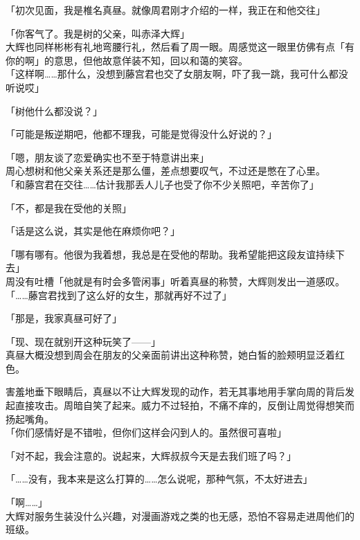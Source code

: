 「初次见面，我是椎名真昼。就像周君刚才介绍的一样，我正在和他交往」

「你客气了。我是树的父亲，叫赤泽大辉」\\

大辉也同样彬彬有礼地弯腰行礼，然后看了周一眼。周感觉这一眼里仿佛有点「有你的啊」的意思，但他故意佯装不知，回以和蔼的笑容。\\

「这样啊……那什么，没想到藤宫君也交了女朋友啊，吓了我一跳，我可什么都没听说哎」

「树他什么都没说？」

「可能是叛逆期吧，他都不理我，可能是觉得没什么好说的？」

「嗯，朋友谈了恋爱确实也不至于特意讲出来」\\

周心想树和他父亲关系还是那么僵，差点想要叹气，不过还是憋在了心里。\\

「和藤宫君在交往……估计我那丢人儿子也受了你不少关照吧，辛苦你了」

「不，都是我在受他的关照」

「话是这么说，其实是他在麻烦你吧？」

「哪有哪有。他很为我着想，我总是在受他的帮助。我希望能把这段友谊持续下去」\\

周没有吐槽「他就是有时会多管闲事」听着真昼的称赞，大辉则发出一道感叹。\\

「……藤宫君找到了这么好的女生，那就再好不过了」

「那是，我家真昼可好了」

「现、现在就别开这种玩笑了——」\\

真昼大概没想到周会在朋友的父亲面前讲出这种称赞，她白皙的脸颊明显泛着红色。

害羞地垂下眼睛后，真昼以不让大辉发现的动作，若无其事地用手掌向周的背后发起直接攻击。周暗自笑了起来。威力不过轻拍，不痛不痒的，反倒让周觉得想笑而扬起嘴角。\\

「你们感情好是不错啦，但你们这样会闪到人的。虽然很可喜啦」

「对不起，我会注意的。说起来，大辉叔叔今天是去我们班了吗？」

「……没有，我本来是这么打算的……怎么说呢，那种气氛，不太好进去」

「啊……」\\

大辉对服务生装没什么兴趣，对漫画游戏之类的也无感，恐怕不容易走进周他们的班级。\\

